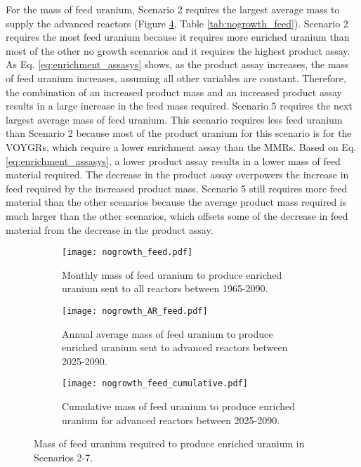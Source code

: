 For the mass of feed uranium, Scenario 2 requires the largest average mass 
to supply the advanced reactors (Figure \ref{fig:nogrowth_feed}, Table 
\ref{tab:nogrowth_feed}). Scenario 2 requires the most feed uranium 
because it requires more enriched uranium than most 
of the other no growth scenarios and it requires the highest product 
assay. As Eq. \ref{eq:enrichment_assasys} shows, as the product assay 
increases, the mass of feed uranium increases, assuming all other 
variables are constant. Therefore, the combination of an increased product 
mass and an increased product assay results in a large increase in the feed 
mass required. Scenario 5 requires the next largest average 
mass of feed uranium. This scenario requires less feed uranium than Scenario 2 
because 
most of the product uranium for this scenario is for the VOYGRs, which 
require a lower enrichment assay than the \glspl{MMR}. Based on Eq. 
\ref{eq:enrichment_assasys}, a lower product assay results in 
a lower mass of feed material required. The decrease in the product 
assay overpowers the increase in feed required by the increased product mass. 
Scenario 5 still requires more feed 
material than the other scenarios because the average product mass required 
is much larger than the other scenarios, which offsets some of the decrease 
in feed material from the decrease in the product assay. 

\begin{figure}
    \centering
    \begin{subfigure}[b]{0.45\textwidth}
        \centering
        \texttt{[image: nogrowth\_feed.pdf]}
        \caption{Monthly mass of feed uranium to produce enriched uranium sent to 
        all reactors between 1965-2090.}
        \label{fig:nogrowth_all_feed}
    \end{subfigure}
    \hfill
    \begin{subfigure}[b]{0.45\textwidth}
        \centering
        \texttt{[image: nogrowth\_AR\_feed.pdf]}
        \caption{Annual average mass of feed uranium to produce enriched uranium sent to 
        advanced reactors between 2025-2090.}
        \label{fig:nogrowth_AR_feed}
    \end{subfigure}
    \begin{subfigure}[b]{0.45\textwidth}
        \centering
        \texttt{[image: nogrowth\_feed\_cumulative.pdf]}
        \caption{Cumulative mass of feed uranium to produce enriched 
        uranium for advanced reactors between 2025-2090.}
        \label{fig:nogrowth_feed_cumulative}
    \end{subfigure}
       \caption{Mass of feed uranium required to produce enriched uranium
        in Scenarios 2-7.}
       \label{fig:nogrowth_feed}
\end{figure}


